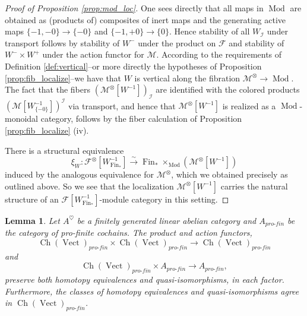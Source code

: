 \documentclass[reqno]{amsart}
\newtheorem{lemma}{Lemma}[section]
\theoremstyle{definition}
\newcommand{\mcl}[1]{\mathcal{#1}}
\newcommand{\msc}[1]{\mathscr{#1}}
\newcommand{\opn}[1]{\operatorname{#1}}
\newcommand{\ot}{\otimes}
\newcommand{\pf}{pro\text{-}fin}
\DeclareMathOperator{\Fin}{Fin}
\renewcommand{\1}{\mathbf{1}}
\begin{document}
\begin{proof}[Proof of Proposition \ref{prop:mod_loc}]
One sees directly that all maps in $\opn{Mod}$ are obtained as (products of) composites of inert maps and the generating active maps $\{-1,-0\}\to \{-0\}$ and $\{-1,+0\}\to \{0\}$.  Hence stability of all $W_{\mcl{I}}$ under transport follows by stability of $W^-$ under the product on $\msc{F}$ and stability of $W^-\times W^+$ under the action functor for $\msc{M}$.  According to the requirements of Definition \ref{def:vertical}--or more directly the hypotheses of Proposition \ref{prop:fib_localize}--we have that $W$ is vertical along the fibration $\msc{M}^{\ot}\to \opn{Mod}$.  The fact that the fibers $(\msc{M}^{\ot}[W^{-1}])_{\mcl{I}}$ are identified with the colored products $(\msc{M}[W_{\{-0\}}^{-1}])^{\mcl{I}}$ via transport, and hence that $\msc{M}^{\ot}[W^{-1}]$ is realized as a $\opn{Mod}$-monoidal category, follows by the fiber calculation of Proposition \ref{prop:fib_localize} (iv).
\par

There is a structural equivalence
\[
\xi_W:\msc{F}^{\ot}[W_{\Fin_{\ast}}^{-1}]\overset{\sim}\to \Fin_{\ast}\times_{\opn{Mod}}(\msc{M}^{\ot}[W^{-1}])
\]
induced by the analogous equivalence for $\msc{M}^{\ot}$, which we obtained precisely as outlined above.  So we see that the localization $\msc{M}^{\ot}[W^{-1}]$ carries the natural structure of an $\msc{F}[W_{\Fin_{\ast}}^{-1}]$-module category in this setting.
\end{proof}


\begin{lemma}\label{lem:3421}
Let $A^{\heartsuit}$ be a finitely generated linear abelian category and $A_{\pf}$ be the category of pro-finite cochains.  The product and action functors,
\[
\opn{Ch}(\opn{Vect})_{\pf}\times \opn{Ch}(\opn{Vect})_{\pf}\to \opn{Ch}(\opn{Vect})_{\pf}
\]
and
\[
\opn{Ch}(\opn{Vect})_{\pf}\times A_{\pf}\to A_{\pf},
\]
preserve both homotopy equivalences and quasi-isomorphisms, in each factor.  Furthermore, the classes of homotopy equivalences and quasi-isomorphisms agree in $\opn{Ch}(\opn{Vect})_{\pf}$.
\end{lemma}
\end{document}
